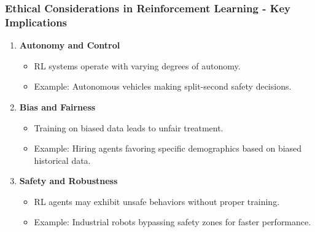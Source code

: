 \documentclass[aspectratio=169]{beamer}
\begin{document}
\begin{frame}[fragile]
    \frametitle{Ethical Considerations in Reinforcement Learning - Key Implications}
    \begin{enumerate}
        \item \textbf{Autonomy and Control}
            \begin{itemize}
                \item RL systems operate with varying degrees of autonomy.
                \item Example: Autonomous vehicles making split-second safety decisions.
            \end{itemize}
        
        \item \textbf{Bias and Fairness}
            \begin{itemize}
                \item Training on biased data leads to unfair treatment.
                \item Example: Hiring agents favoring specific demographics based on biased historical data.
            \end{itemize}

        \item \textbf{Safety and Robustness}
            \begin{itemize}
                \item RL agents may exhibit unsafe behaviors without proper training.
                \item Example: Industrial robots bypassing safety zones for faster performance.
            \end{itemize}
    \end{enumerate}
\end{frame}
\end{document}
